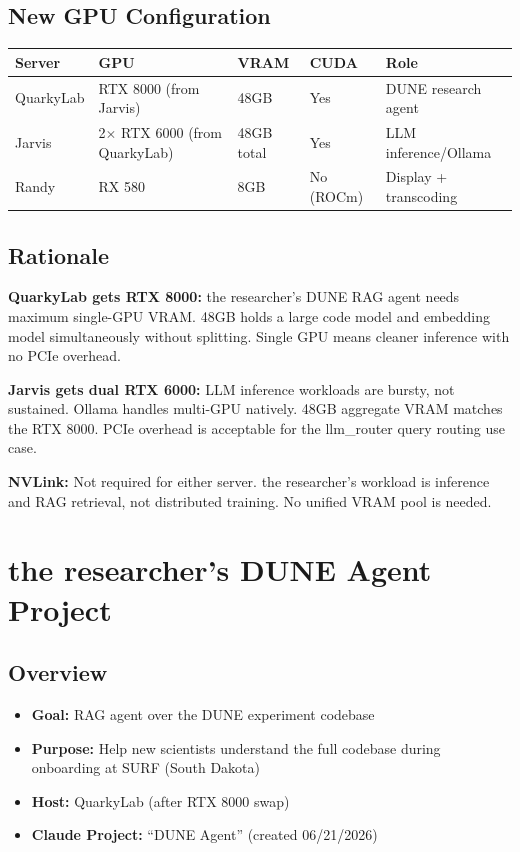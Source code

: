\documentclass[11pt, letterpaper]{article}
\begin{document}
\subsection{New GPU Configuration}

\begin{tabularx}{\textwidth}{llllX}
\toprule
\textbf{Server} & \textbf{GPU} & \textbf{VRAM} & \textbf{CUDA} & \textbf{Role} \\
\midrule
QuarkyLab & RTX 8000 (from Jarvis)      & 48GB       & Yes & DUNE research agent \\
Jarvis    & 2$\times$ RTX 6000 (from QuarkyLab) & 48GB total & Yes & LLM inference/Ollama \\
Randy     & RX 580                      & 8GB        & No (ROCm) & Display + transcoding \\
\bottomrule
\end{tabularx}

\subsection{Rationale}

\textbf{QuarkyLab gets RTX 8000:} the researcher's DUNE RAG agent needs maximum single-GPU VRAM. 48GB holds a large code model and embedding model simultaneously without splitting. Single GPU means cleaner inference with no PCIe overhead.

\textbf{Jarvis gets dual RTX 6000:} LLM inference workloads are bursty, not sustained. Ollama handles multi-GPU natively. 48GB aggregate VRAM matches the RTX 8000. PCIe overhead is acceptable for the llm\_router query routing use case.

\textbf{NVLink:} Not required for either server. the researcher's workload is inference and RAG retrieval, not distributed training. No unified VRAM pool is needed.

\section{the researcher's DUNE Agent Project}

\subsection{Overview}
\begin{itemize}[leftmargin=*, nosep]
    \item \textbf{Goal:} RAG agent over the DUNE experiment codebase
    \item \textbf{Purpose:} Help new scientists understand the full codebase during onboarding at SURF (South Dakota)
    \item \textbf{Host:} QuarkyLab (after RTX 8000 swap)
    \item \textbf{Claude Project:} ``DUNE Agent'' (created 06/21/2026)
\end{itemize}
\end{document}
